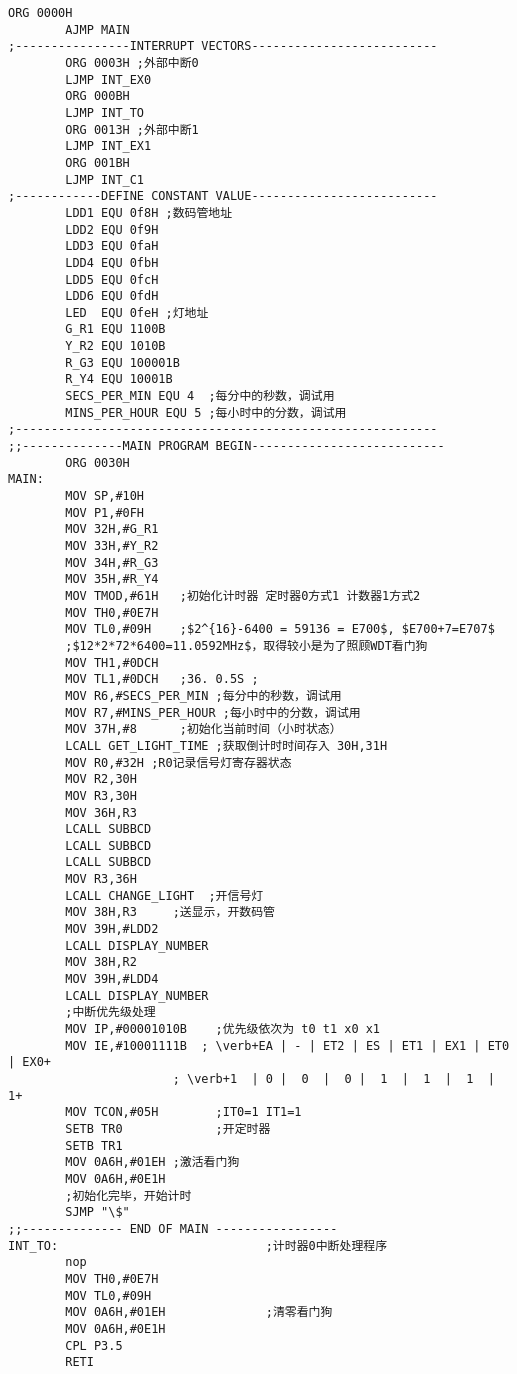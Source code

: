\begin{lstlisting}[language={[x86masm]assembler},escapeinside=""]
		ORG 0000H
		AJMP MAIN
;----------------INTERRUPT VECTORS--------------------------
		ORG 0003H ;外部中断0
		LJMP INT_EX0
		ORG 000BH							
		LJMP INT_TO							
		ORG 0013H ;外部中断1						
		LJMP INT_EX1							
		ORG 001BH							
		LJMP INT_C1							
;------------DEFINE CONSTANT VALUE--------------------------
		LDD1 EQU 0f8H ;数码管地址
		LDD2 EQU 0f9H
		LDD3 EQU 0faH
		LDD4 EQU 0fbH
		LDD5 EQU 0fcH
		LDD6 EQU 0fdH
		LED  EQU 0feH ;灯地址
		G_R1 EQU 1100B
		Y_R2 EQU 1010B
		R_G3 EQU 100001B
		R_Y4 EQU 10001B
		SECS_PER_MIN EQU 4  ;每分中的秒数，调试用
		MINS_PER_HOUR EQU 5 ;每小时中的分数，调试用																							
;-----------------------------------------------------------	
;;--------------MAIN PROGRAM BEGIN---------------------------
		ORG 0030H				 
MAIN:	
		MOV SP,#10H
		MOV P1,#0FH
		MOV 32H,#G_R1
		MOV 33H,#Y_R2
		MOV 34H,#R_G3
		MOV 35H,#R_Y4
		MOV TMOD,#61H	;初始化计时器 定时器0方式1 计数器1方式2
		MOV TH0,#0E7H	
		MOV TL0,#09H	;$2^{16}-6400 = 59136 = E700$, $E700+7=E707$
		;$12*2*72*6400=11.0592MHz$，取得较小是为了照顾WDT看门狗
		MOV TH1,#0DCH
		MOV TL1,#0DCH	;36. 0.5S ;	
		MOV R6,#SECS_PER_MIN ;每分中的秒数，调试用
		MOV R7,#MINS_PER_HOUR ;每小时中的分数，调试用
		MOV 37H,#8		;初始化当前时间（小时状态）
		LCALL GET_LIGHT_TIME ;获取倒计时时间存入 30H,31H
		MOV R0,#32H	;R0记录信号灯寄存器状态
		MOV R2,30H
		MOV R3,30H
		MOV 36H,R3
		LCALL SUBBCD
		LCALL SUBBCD
		LCALL SUBBCD
		MOV R3,36H
		LCALL CHANGE_LIGHT	;开信号灯
		MOV 38H,R3	   ;送显示，开数码管
		MOV 39H,#LDD2
		LCALL DISPLAY_NUMBER
		MOV 38H,R2
		MOV 39H,#LDD4
		LCALL DISPLAY_NUMBER
		;中断优先级处理
		MOV IP,#00001010B	 ;优先级依次为 t0 t1 x0 x1
		MOV IE,#10001111B  ; \verb+EA | - | ET2 | ES | ET1 | EX1 | ET0 | EX0+
                       ; \verb+1  | 0 |  0  |  0 |  1  |  1  |  1  |  1+
		MOV TCON,#05H		 ;IT0=1 IT1=1
		SETB TR0			 ;开定时器
		SETB TR1
		MOV 0A6H,#01EH ;激活看门狗
		MOV 0A6H,#0E1H 
		;初始化完毕，开始计时
		SJMP "\$"
;;-------------- END OF MAIN -----------------
INT_TO:								;计时器0中断处理程序
		nop
		MOV TH0,#0E7H 				
		MOV TL0,#09H
		MOV 0A6H,#01EH 				;清零看门狗
		MOV 0A6H,#0E1H 
		CPL P3.5
		RETI
		

\end{lstlisting}
